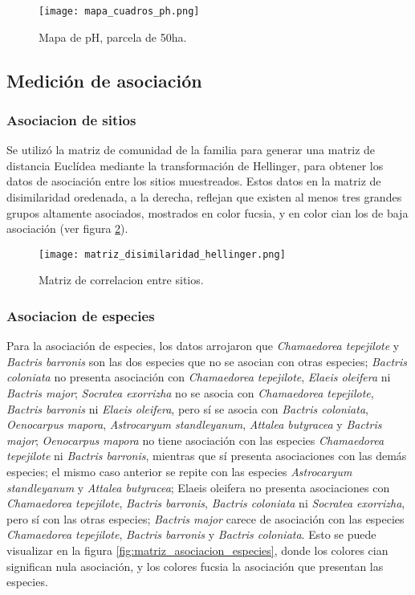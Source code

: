 \documentclass[11pt,]{article}
\begin{document}
\begin{figure}
\centering
\texttt{[image: mapa\_cuadros\_ph.png]}
\caption{Mapa de pH, parcela de 50ha. \label{fig:mapa_cuadros_pH}}
\end{figure}

\subsection{Medición de asociación}\label{mediciuxf3n-de-asociaciuxf3n}

\subsubsection{Asociacion de sitios}\label{asociacion-de-sitios}

Se utilizó la matriz de comunidad de la familia para generar una matriz
de distancia Euclídea mediante la transformación de Hellinger, para
obtener los datos de asociación entre los sitios muestreados. Estos
datos en la matriz de disimilaridad oredenada, a la derecha, reflejan
que existen al menos tres grandes grupos altamente asociados, mostrados
en color fucsia, y en color cian los de baja asociación (ver figura
\ref{fig:matriz_disimilaridad_hellinger}).

\begin{figure}
\centering
\texttt{[image: matriz\_disimilaridad\_hellinger.png]}
\caption{Matriz de correlacion entre sitios.
\label{fig:matriz_disimilaridad_hellinger}}
\end{figure}

\subsubsection{Asociacion de especies}\label{asociacion-de-especies}

Para la asociación de especies, los datos arrojaron que
\emph{Chamaedorea tepejilote} y \emph{Bactris barronis} son las dos
especies que no se asocian con otras especies; \emph{Bactris coloniata}
no presenta asociación con \emph{Chamaedorea tepejilote}, \emph{Elaeis
oleifera} ni \emph{Bactris major}; \emph{Socratea exorrizha} no se
asocia con \emph{Chamaedorea tepejilote}, \emph{Bactris barronis} ni
\emph{Elaeis oleifera}, pero sí se asocia con \emph{Bactris coloniata},
\emph{Oenocarpus mapora}, \emph{Astrocaryum standleyanum}, \emph{Attalea
butyracea} y \emph{Bactris major}; \emph{Oenocarpus mapora} no tiene
asociación con las especies \emph{Chamaedorea tepejilote} ni
\emph{Bactris barronis}, mientras que sí presenta asociaciones con las
demás especies; el mismo caso anterior se repite con las especies
\emph{Astrocaryum standleyanum} y \emph{Attalea butyracea}; Elaeis
oleifera no presenta asociaciones con \emph{Chamaedorea tepejilote},
\emph{Bactris barronis}, \emph{Bactris coloniata} ni \emph{Socratea
exorrizha}, pero sí con las otras especies; \emph{Bactris major} carece
de asociación con las especies \emph{Chamaedorea tepejilote},
\emph{Bactris barronis} y \emph{Bactris coloniata}. Esto se puede
visualizar en la figura \ref{fig:matriz_asociacion_especies}, donde los
colores cian significan nula asociación, y los colores fucsia la
asociación que presentan las especies.
\end{document}

